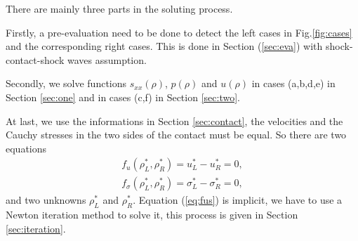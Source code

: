 \documentclass[review]{elsarticle}
\begin{document}
There are mainly three parts in the soluting process. 

Firstly, a pre-evaluation need to  be done to detect the left cases in Fig.\ref{fig:cases} and the corresponding right cases. This is done in Section (\ref{sec:eva}) with shock-contact-shock waves assumption.  

Secondly,  we solve functions $s_{xx}(\rho)$, $p(\rho)$ and $u(\rho)$ in cases (a,b,d,e) in Section \ref{sec:one} and in cases (c,f) in Section \ref{sec:two}.

At last,  we use  the informations in Section \ref{sec:contact}, the velocities and the Cauchy stresses  in the two sides of the contact must be equal. So there are two equations 
\begin{equation}\label{eq:fus}
  \begin{align}
	f_u(\rho^*_L,\rho^*_R) = u_L^* -u_R^* = 0,\\
	f_\sigma(\rho^*_L,\rho^*_R) = \sigma_L^* -\sigma_R^* = 0,
\end{align}
\end{equation}
and two unknowns $\rho_L^*$ and $\rho_R^*$. Equation (\ref{eq:fus}) is implicit, we have to use a Newton iteration method to solve it, this process is given in Section \ref{sec:iteration}.
\end{document}
